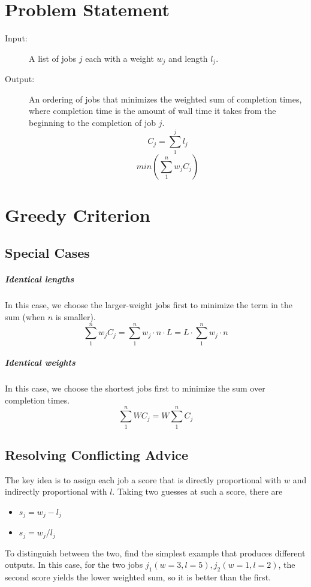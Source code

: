 \documentclass[11pt]{article}
\begin{document}
\section{Problem Statement}
	\begin{description}
		\item[Input:] A list of jobs $j$ each with a weight $w_j$ and length $l_j$.
		\item[Output:] An ordering of jobs that minimizes the weighted sum of completion times, where completion time is the amount of wall time it takes from the beginning to the completion of job $j$.
		\[C_j = \sum_1^j l_j\]
		\[min(\sum_1^nw_jC_j)\]
	\end{description}
	
\section{Greedy Criterion}
	\subsection{Special Cases}
		\subparagraph{Identical lengths} In this case, we choose the larger-weight jobs first to minimize the term in the sum (when $n$ is smaller).
			\begin{equation}
				\sum_1^n w_jC_j = \sum_1^n w_j \cdot n \cdot L = L \cdot \sum_1^n w_j \cdot n
			\end{equation}
		\subparagraph{Identical weights} In this case, we choose the shortest jobs first to minimize the sum over completion times.
			\begin{equation}
				\sum_1^n WC_j = W\sum_1^n C_j
			\end{equation}
			
	\subsection{Resolving Conflicting Advice}
		The key idea is to assign each job a score that is directly proportional with $w$ and indirectly proportional with $l$. Taking two guesses at such a score, there are 
		\begin{itemize}
			\item $s_j = w_j - l_j$
			\item $s_j = w_j / l_j$
		\end{itemize}
		To distinguish between the two, find the simplest example that produces different outputs. In this case, for the two jobs $j_1(w=3, l=5), j_2(w=1,l=2)$, the second score yields the lower weighted sum, so it is better than the first.
		
\end{document}
